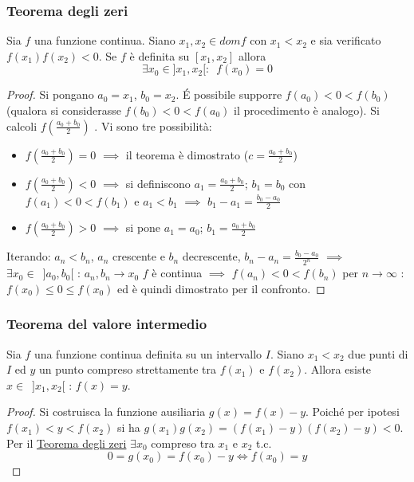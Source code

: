 \documentclass[10pt]{article}
\theoremstyle{plain}
\begin{document}
\subsubsection{Teorema degli zeri}
\hypertarget{zeri}{\begin{ther}
Sia $f$ una funzione continua. Siano $x_1, x_2 \in dom f$ con $x_1 < x_2$ e sia verificato $f(x_1) f(x_2) < 0$. Se $f$ è definita su $[x_1, x_2]$ allora \[\exists x_0 \in ]x_1, x_2[ : \enspace f(x_0) = 0\]
\end{ther}}
\begin{proof}
Si pongano $a_0 = x_1$, $b_0 = x_2$. \'E possibile supporre $f(a_0) < 0 < f(b_0)$ (qualora si considerasse $f(b_0) < 0 < f(a_0)$ il procedimento è analogo). \newline Si calcoli $f(\frac{a_0 + b_0}{2})$ . Vi sono tre possibilità:
\begin{itemize}[label=$\square$]
    \item $f(\frac{a_0 + b_0}{2}) = 0$ $\implies$ il teorema è dimostrato ($c = \frac{a_0 + b_0}{2}$)
    \item $f(\frac{a_0 + b_0}{2}) < 0$ $\implies$ si definiscono $a_1 = \frac{a_0 + b_0}{2}$; $b_1 = b_0$ con $f(a_1) < 0 < f(b_1)$ e $a_1 < b_1$ $\implies$ $b_1 - a_1 = \frac{b_0 - a_0}{2}$
    \item $f(\frac{a_0 + b_0}{2}) > 0$ $\implies$ si pone $a_1 = a_0$; $b_1 = \frac{a_0 + b_0}{2}$
\end{itemize}
Iterando: $a_n < b_n$, $a_n$ crescente e $b_n$ decrescente, $b_n - a_n = \frac{b_0 - a_0}{2^n}$ $\implies$ $\exists x_0 \in \enspace ]a_0, b_0[$ : $a_n, b_n \longrightarrow x_0$
\newline $f$ è continua $\implies$ $f(a_n) < 0 < f(b_n)$ per $n \rightarrow \infty$ : $f(x_0) \leq 0 \leq f(x_0)$ ed è quindi dimostrato per il confronto.
\end{proof}

\subsubsection{Teorema del valore intermedio}
\hypertarget{valint}{\begin{ther}
Sia $f$ una funzione continua definita su un intervallo $I$. Siano $x_1 < x_2$ due punti di $I$ ed $y$ un punto compreso strettamente tra $f(x_1)$ e $f(x_2)$.\newline 
Allora esiste $x \in \enspace ]x_1, x_2[$ : $f(x) = y$.
\end{ther}}
\begin{proof}
Si costruisca la funzione ausiliaria $g(x) = f(x) - y$. Poiché per ipotesi $f(x_1) < y < f(x_2)$ si ha $g(x_1) g(x_2) = (f(x_1) - y)(f(x_2) - y) < 0$. Per il \hyperlink{zeri}{Teorema degli zeri} $\exists x_0$ compreso tra $x_1$ e $x_2$ t.c. 
\[0 = g(x_0) = f(x_0) - y \Longleftrightarrow f(x_0) = y\]
\end{proof}
\end{document}
